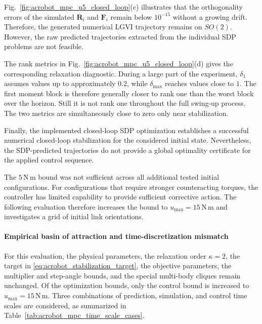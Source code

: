 Fig.~\ref{fig:acrobot_mpc_u5_closed_loop}(c) 
illustrates that
the orthogonality errors of the simulated $\bm R_i$ and $\bm F_i$ remain
below $10^{-15}$ without a growing drift. 
Therefore, the generated numerical LGVI trajectory remains
on $SO(2)$. However, the
raw predicted trajectories extracted from the individual SDP problems are
not feasible.

The rank metrics in Fig.~\ref{fig:acrobot_mpc_u5_closed_loop}(d) gives the
corresponding relaxation diagnostic. During a large part of the experiment,
$\delta_1$ assumes values up to approximately $0.2$, while
$\delta_{\max}$ reaches values close to $1$. The first moment block is
therefore generally closer to rank one than the worst block over the horizon.
Still it is not rank one throughout the full
swing-up process. The two metrics are simultaneously close to zero only near
stabilization. 

Finally, the implemented closed-loop SDP optimization
establishes a successful numerical closed-loop
stabilization for the considered initial state. Nevertheless,
the SDP-predicted trajectories do not provide a global optimality 
certificate for the applied control sequence.

The $5\,\mathrm{N\,m}$ bound was not sufficient across all additional tested
initial configurations. For configurations that require
stronger counteracting torques, the controller has limited capability
to provide sufficient corrective action. The following evaluation 
therefore increases the bound to 
$u_{\max}=15\,\mathrm{N\,m}$ and investigates a grid of initial link
orientations.

\paragraph{Empirical basin of attraction and time-discretization mismatch}
For this evaluation, the physical parameters, the relaxation order $\kappa=2$,
the target in \eqref{eq:acrobot_stabilization_target}, the objective
parameters, the multiplier and step-angle bounds, and the special multi-body cliques remain unchanged. Of the optimization bounds, only the control
bound is increased to $u_{\max}=15\,\mathrm{N\,m}$. Three combinations 
of prediction, simulation,
and control time scales are considered, as summarized in
Table~\ref{tab:acrobot_mpc_time_scale_cases}.

